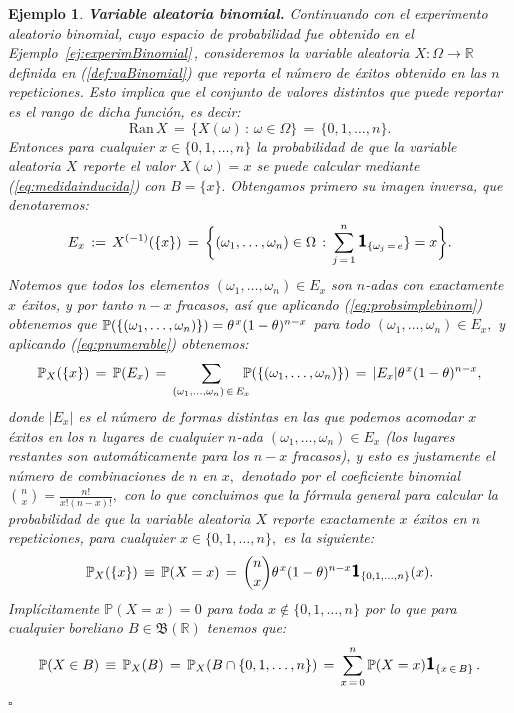 \documentclass[spanish,10pt,letterpaper]{article}
\newtheorem{ejem}{Ejemplo}
\newcommand{\prob}{\mathbb{P}}
\newcommand{\Runo}{\mathbb{R}}
\newcommand{\indic}{\textbf{\textsf{\large{1}}}}
\newcommand{\qed}{\begin{flushright}$\square$\end{flushright}}
\begin{document}
	\begin{ejem}\label{ej:vaBinomial}
		\textbf{Variable aleatoria binomial.} Continuando con el experimento aleatorio binomial, cuyo espacio de probabilidad fue obtenido en el Ejemplo\ \ref{ej:experimBinomial}\,, consideremos la variable aleatoria $X:\Omega\rightarrow\Runo$ definida en (\ref{def:vaBinomial}) que reporta el número de éxitos obtenido en las $n$ repeticiones. Esto implica que el conjunto de valores distintos que puede reportar es el rango de dicha función, es decir:
		$$\text{Ran}\,X \,=\, \{X(\omega)\,:\,\omega\in\Omega\} \,=\, \{0,1,\ldots,n\}.$$
		Entonces para cualquier $x\in\{0,1,\ldots,n\}$ la probabilidad de que la variable aleatoria $X$ reporte el valor $X(\omega)=x$ se puede calcular mediante (\ref{eq:medidainducida}) con $B=\{x\}.$ Obtengamos primero su imagen inversa, que denotaremos:
		\begin{equation*}
			E_x \,:=\, X^{(-1)}(\{x\}) \,=\, \bigg\{(\omega_1,\ldots,\omega_n)\in\Omega\,:\,\sum_{j\,=\,1}^n\indic_{\{\omega_j\,=\,e}\}=x\bigg\}.
		\end{equation*}
		Notemos que todos los elementos $(\omega_1,\ldots,\omega_n)\in E_x$ son $n$-adas con exactamente $x$ éxitos, y por tanto $n-x$ fracasos, así que aplicando (\ref{eq:probsimplebinom}) obtenemos que $\prob(\{(\omega_1,\ldots,\omega_n)\})=\theta^{\hspace{0.3mm}x}(1-\theta)^{n-x}$ para todo $(\omega_1,\ldots,\omega_n)\in E_x,$ y aplicando (\ref{eq:pnumerable}) obtenemos:
		\begin{equation*}
			\prob_X(\{x\}) \,=\, \prob(E_x) \,=\, \sum_{(\omega_1,\ldots,\omega_n)\,\in\,E_x}\!\!\!\!\prob(\{(\omega_1,\ldots,\omega_n)\}) \,=\, |E_x|\theta^{\hspace{0.3mm}x}(1-\theta)^{n-x},
		\end{equation*}
		donde $|E_x|$ es el número de formas distintas en las que podemos acomodar $x$ éxitos en los $n$ lugares de cualquier $n$-ada $(\omega_1,\ldots,\omega_n)\in E_x$ (los lugares restantes son automáticamente para los $n-x$ fracasos), y esto es justamente el número de combinaciones de $n$ en $x,$ denotado por el coeficiente binomial $\binom{n}{x}=\frac{n!}{x!(n-x)!},$ con lo que concluimos que la fórmula general para calcular la probabilidad de que la variable aleatoria $X$ reporte exactamente $x$ éxitos en $n$ repeticiones, para cualquier $x\in\{0,1,\ldots,n\},$ es la siguiente:
		\begin{equation}\label{eq:fmpBinomial}
			\prob_X(\{x\}) \,\equiv\, \prob(X=x) \,=\, \binom{n}{x}\theta^{\hspace{0.3mm}x}(1-\theta)^{n-x}\indic_{\{0,1,\ldots,n\}}(x).
		\end{equation}
		Implícitamente $\prob(X=x)=0$ para toda $x\notin\{0,1,\ldots,n\}$ por lo que para cualquier boreliano $B\in\mathfrak{B}(\Runo)$ tenemos que:
		\begin{equation}\label{eq:probBinomial}
			\prob(X\in B) \,\equiv\, \prob_X(B) \,=\, \prob_X(B\cap\{0,1,\ldots,n\}) \,=\, \sum_{x\,=\,0}^n\prob(X=x)\indic_{\{x\,\in\,B\}}\,.
		\end{equation} \qed 
	\end{ejem}
	
\end{document}
